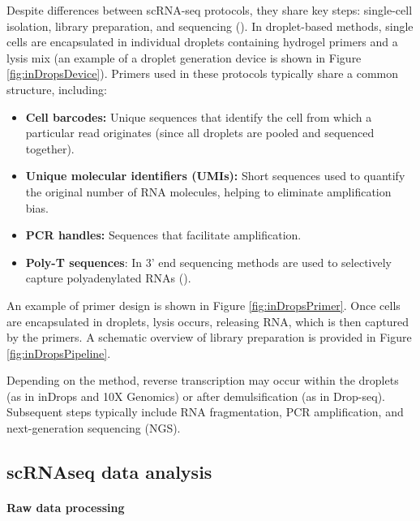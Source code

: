 Despite differences between scRNA-seq protocols, they share key steps:
single-cell isolation, library preparation, and sequencing (\cite{Andrews2018}).
In droplet-based methods, single cells are encapsulated in individual droplets containing hydrogel primers
and a lysis mix (an example of a droplet generation device is shown in Figure \ref{fig:inDropsDevice}).
Primers used in these protocols typically share a common structure, including:

\begin{itemize}
  \item \textbf{Cell barcodes:} Unique sequences that identify the cell from which a particular read originates (since all droplets are pooled and sequenced together).
  \item \textbf{Unique molecular identifiers (UMIs):} Short sequences used to quantify the original number of RNA molecules, helping to eliminate amplification bias.
  \item \textbf{PCR handles:} Sequences that facilitate amplification.
  \item \textbf{Poly-T sequences}: In 3' end sequencing methods are used to selectively capture polyadenylated RNAs (\cite{Zhang2019}).
\end{itemize}
An example of primer design is shown in Figure \ref{fig:inDropsPrimer}.
Once cells are encapsulated in droplets, lysis occurs, releasing RNA, which is then captured by the primers.
A schematic overview of library preparation is provided in Figure \ref{fig:inDropsPipeline}.

Depending on the method, reverse transcription may occur within the droplets
(as in inDrops and 10X Genomics) or after demulsification (as in Drop-seq).
Subsequent steps typically include RNA fragmentation, PCR amplification, and next-generation sequencing (NGS).

\subsection{scRNAseq data analysis}

\paragraph{Raw data processing}


